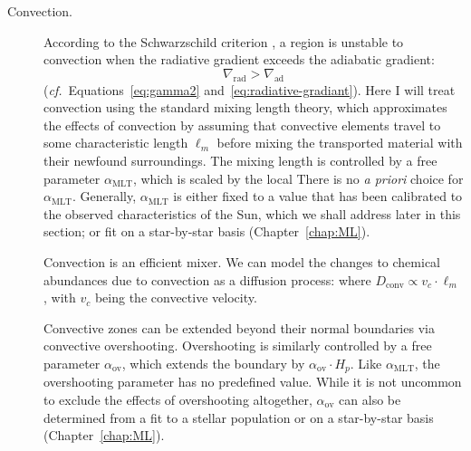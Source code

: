 \begin{description}
    \item[Convection.] 
    According to the Schwarzschild criterion \citep[e.g.,][]{1958ses..book.....S}, a region is unstable to convection when the radiative gradient exceeds the adiabatic gradient: 
    \begin{equation}
        \nabla_{\text{rad}} 
        > 
        \nabla_{\text{ad}}
    \end{equation}
    (\emph{cf.}~Equations~\ref{eq:gamma2} and~\ref{eq:radiative-gradiant}). 
    Here I will treat convection using the standard \citet{1958ZA.....46..108B} mixing length theory, which approximates the effects of convection by assuming that convective elements travel to some characteristic length $\ell_m$ before mixing the transported material with their newfound surroundings. %
    The mixing length is controlled by a free parameter $\alpha_{\text{MLT}}$, which is scaled by the local 
    There is no \emph{a priori} choice for $\alpha_{\text{MLT}}$. 
    Generally, $\alpha_{\text{MLT}}$ is either fixed to a value that has been calibrated to the observed characteristics of the Sun, which we shall address later in this section; or fit on a star-by-star basis (Chapter~\ref{chap:ML}). 
    
    Convection is an efficient mixer. %
    We can model the changes to chemical abundances due to convection as a diffusion process:
    where ${D_{\text{conv}} \propto v_c \cdot \ell_m}$, with $v_c$ being the convective velocity.
    
    Convective zones can be extended beyond their normal boundaries via convective overshooting. 
    Overshooting is similarly controlled by a free parameter $\alpha_{\text{ov}}$, which extends the boundary by ${\alpha_{\text{ov}} \cdot H_p}$. 
    Like $\alpha_{\text{MLT}}$, the overshooting parameter has no predefined value. 
    While it is not uncommon to exclude the effects of overshooting altogether, $\alpha_{\text{ov}}$ can also be determined from a fit to a stellar population \citep[e.g.,][]{2005ARA&A..43..387G} or on a star-by-star basis (Chapter~\ref{chap:ML}). 
\end{description}

